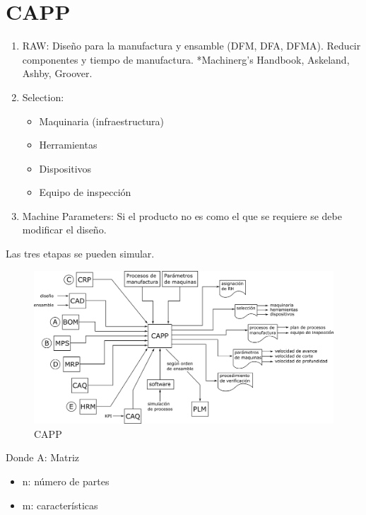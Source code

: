 \section{CAPP}

\begin{enumerate}
    \item RAW: Diseño para la manufactura y ensamble (DFM, DFA, DFMA). Reducir componentes y tiempo de manufactura. *Machinerg's Handbook, Askeland, Ashby, Groover.
    
    \item Selection:
        \begin{itemize}
            \item Maquinaria (infraestructura)
            \item Herramientas
            \item Dispositivos 
            \item Equipo de inspección  
        \end{itemize}
        
    \item Machine Parameters: Si el producto no es como el que se requiere se debe modificar el diseño. 
\end{enumerate}

Las tres etapas se pueden simular. 

\begin{figure}[h!]
    \centering
        \includegraphics[scale=0.10]{Manufactura Integrada por Computadora Figuras/Figura08 CAPP.png}
        \caption{CAPP}
\end{figure}

Donde 
A: Matriz 
\begin{itemize}
    \item n: número de partes
    \item m: características 
\end{itemize}

